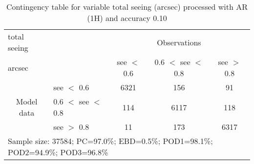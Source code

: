 \begin{table}[]
\begin{center}
\begin{tabular}{llccc}
\hline
{total seeing}                                       &                                                    & \multicolumn{3}{c}{Observations}                 \\
{arcsec}                                       &                             & see $<$ 0.6   & 0.6 $<$ see $<$ 0.8 & see $>$ 0.8 \\
\hline
\multicolumn{1}{c}{\multirow{3}{*}{Model data}}  & see $<$ 0.6             & 6321                & 156                       & 91              \\
                                                 & 0.6  $<$ see $<$ 0.8 & 114                & 6117                       & 118              \\
                                                 & see $>$ 0.8             & 11                & 173                       & 6317              \\
\hline
\multicolumn{5}{l}{Sample size: 37584; PC=97.0\%; EBD=0.5\%; POD1=98.1\%; POD2=94.9\%; POD3=96.8\%}
\end{tabular}
\end{center}
\caption{Contingency table for variable total seeing (arcsec) processed with AR (1H) and accuracy 0.10}
\label{tab:contingencyseeAFT}
\end{table}
